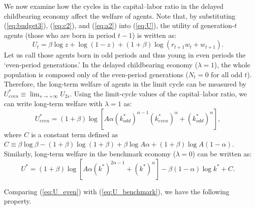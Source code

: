 \documentclass[nogrid]{MBE}%
\begin{document}
{We now examine how the cycles in the capital--labor ratio in the delayed
childbearing economy affect the welfare of agents. Note that, by substituting
(\ref{eq:budget3}), (\ref{eq:c2}), and (\ref{eq:a2}) into (\ref{eq:U}), the
utility of generation-$t$ agents (those who are born in period $t-1$) is
written as:
\begin{equation}
U_{t}=\beta\log z+\log(1-z)+(1+\beta)\log\left(  r_{t+1}w_{t}+w_{t+1}\right). \label{eq:welfare}%
\end{equation}
Let us call those agents born in odd periods and thus young in even periods
the `even-period generations.' In the delayed childbearing economy
($\lambda=1$), the whole population is composed only of the even-period
generations ($N_{t}=0$ for all odd $t$). Therefore, the long-term welfare of
agents in the limit cycle can be measured by $U_{even}^{\ast}\equiv
\lim_{s\rightarrow+\infty}U_{2s}$. Using the limit-cycle values of the
capital--labor ratio, we can write long-term welfare with $\lambda=1$ as:
\begin{equation}
U_{even}^{\ast}=\left(  1+\beta\right)  \log[A\alpha\left(  k_{odd}^{\ast
}\right)  ^{\alpha-1}\left(  k_{even}^{\ast}\right)  ^{\alpha}+\left(
k_{odd}^{\ast}\right)  ^{\alpha}], \label{eq:U_even}%
\end{equation}
where $C$ is a constant term defined as $C\equiv\beta\log\beta-(1+\beta
)\log(1+\beta)+\beta\log A\alpha+(1+\beta)\log A\left(  1-\alpha\right)  $.
Similarly, long-term welfare in the benchmark economy ($\lambda=0$) can be
written as:
\begin{equation}
U^{\ast}=\left(  1+\beta\right)  \log[A\alpha\left(  k^{\ast}\right)
^{2\alpha-1}+\left(  k^{\ast}\right)  ^{\alpha}]-\beta\left(  1-\alpha\right)
\log k^{\ast}+C. \label{eq:U_benchmark}%
\end{equation}


Comparing (\ref{eq:U_even}) with (\ref{eq:U_benchmark}), we have the following property.

%

}
\end{document}
